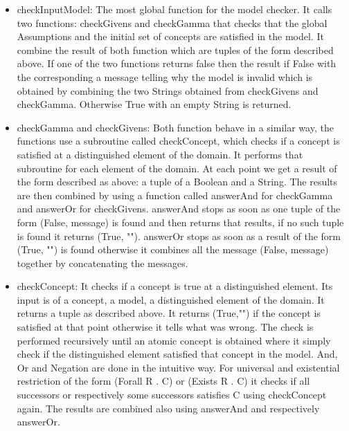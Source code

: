 \begin{itemize}
\item checkInputModel: The most global function for the model checker.
   It calls two functions: checkGivens and checkGamma that checks that
   the global Assumptions and the initial set of concepts are satisfied
   in the model. It combine the result of both function which are tuples of
   the form described above. If one of the two functions returns false then
   the result if False with the corresponding a message telling why
   the model is invalid which is obtained by combining the two Strings
   obtained from checkGivens and checkGamma. Otherwise True with
   an empty String is returned.

\item checkGamma and checkGivens: Both function behave in a similar way,
   the functions use a subroutine called checkConcept, which checks if a concept is
   satisfied at a distinguished element of the domain. It performs that subroutine
   for each element of the domain. At each point we get a result of the form
   described as above: a tuple of a Boolean and a String. The results are
   then combined by using a function called answerAnd for checkGamma
   and answerOr for checkGivens. answerAnd stops as soon as one tuple
   of the form (False, message) is found and then returns that results, if no such
   tuple is found it returns (True, ""). answerOr stops as soon as a result of
   the form (True, "") is found otherwise it combines all the message (False, message)
   together by concatenating the messages.

\item checkConcept: It checks if a concept is true at a distinguished element. Its input is of a
   concept, a model, a distinguished element of the domain. It returns a tuple as described
   above. It returns (True,"") if the concept is satisfied at that point otherwise it tells what
   was wrong. The check is performed recursively until an atomic concept is obtained where it
   simply check if the distinguished element satisfied that concept in the model. And, Or and Negation
   are done in the intuitive way. For universal and existential restriction of the form (Forall R . C) or
   (Exists R . C) it checks if all successors or respectively some successors satisfies C using checkConcept again.
   The results are combined also using answerAnd and respectively answerOr.
\end{itemize}

